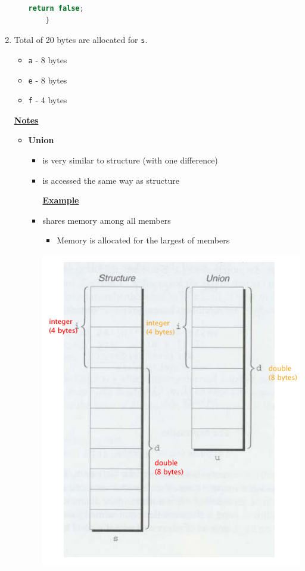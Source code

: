 \documentclass[12pt]{article}
\begin{document}
\begin{enumerate}[1.]
\begin{enumerate}[a)]
\begin{lstlisting}[language=c]
        return false;
    }
\end{lstlisting}

    \end{enumerate}

    \item

    \bigskip

    Total of 20 bytes are allocated for \texttt{s}.

    \begin{itemize}
        \item \texttt{a} - 8 bytes
        \item \texttt{e} - 8 bytes
        \item \texttt{f} - 4 bytes
    \end{itemize}

    \bigskip

    \underline{\textbf{Notes}}

    \begin{itemize}
        \item \textbf{Union}

        \begin{itemize}
            \item is very similar to structure (with one difference)
            \item is accessed the same way as structure

            \bigskip

            \underline{\textbf{Example}}

            \bigskip


            \item shares memory among all members
            \begin{itemize}
                \item Memory is allocated for the largest of members
            \end{itemize}

            \bigskip

            \begin{center}
            \includegraphics[width=0.6\linewidth]{images/review_7_solution_9.png}
            \end{center}


\end{itemize}
\end{itemize}
\end{enumerate}
\end{document}
